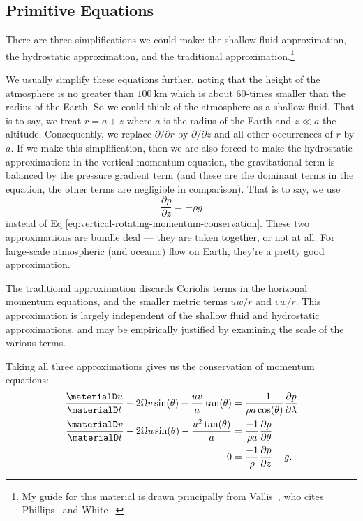 \subsection{Primitive Equations}

There are three simplifications we could make: the shallow fluid
approximation, the hydrostatic approximation, and the traditional
approximation.\footnote{My guide for this material is drawn
principally from Vallis~\cite[\S\S2.2.4--2.2.5]{vallis_2017}, who cites
Phillips~\cite{phillips1966TheEquationsofMotionforaShallowRotatingAtmosphereandtheTraditionalApproximation}
and White~\cite{white2002}.}

We usually simplify these equations further, noting that the height of
the atmosphere is no greater than $\SI{100}{\km}$ which is about
60-times smaller than the radius of the Earth. So we could think of the
atmosphere as a shallow fluid.
That is to say, we treat $r=a+z$ where
$a$ is the radius of the Earth and $z\ll a$ the altitude. Consequently,
we replace $\partial/\partial r$ by $\partial/\partial z$ and all other
occurrences of $r$ by $a$. If we make this simplification, then we
are also forced to make the hydrostatic
approximation: in the vertical
momentum equation, the gravitational term is balanced by the pressure
gradient term (and these are the dominant terms in the equation, the
other terms are negligible in comparison). That is to say, we use
\begin{equation}
  \frac{\partial p}{\partial z}=-\rho g
\end{equation}
instead of Eq \eqref{eq:vertical-rotating-momentum-conservation}. These
two approximations are bundle deal --- they are taken together, or not
at all. For large-scale atmospheric (and oceanic) flow on Earth, they're
a pretty good approximation.

The traditional approximation discards Coriolis terms in the horizonal
momentum equations, and the smaller metric terms $uw/r$ and
$vw/r$. This approximation is largely independent of the shallow fluid
and hydrostatic approximations, and may be empirically justified by
examining the scale of the various terms.

\begin{prop}
Taking all three approximations gives us the conservation of momentum equations:
\begin{subequations}
  \begin{align}
    \frac{\materialD u}{\materialD t}
    - 2\Omega v\sin(\theta) - \frac{uv}{a}\tan(\theta)
    &= \frac{-1}{\rho a\cos(\theta)}\frac{\partial p}{\partial\lambda}\\
    \frac{\materialD v}{\materialD t}
    - 2\Omega u\sin(\theta) - \frac{u^{2}\tan(\theta)}{a}
    &= \frac{-1}{\rho a}\frac{\partial p}{\partial\theta} \\
    0 &= \frac{-1}{\rho}\frac{\partial p}{\partial z}-g.
  \end{align}
\end{subequations}
\end{prop}

